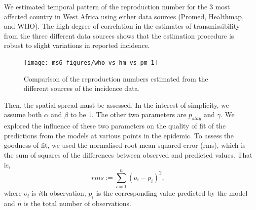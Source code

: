 \documentclass[11pt,]{article}
\begin{document}
We estimated temporal pattern of the reproduction number for the 3 most affected country in West Africa
using either data sources (Promed, Healthmap, and WHO).
The high degree of correlation in the estimates of transmissibility from the three
different data sources shows that the estimation procedure is robust
to slight variations in reported incidence.

\begin{figure}
  \centering
  \texttt{[image: ms6-figures/who\_vs\_hm\_vs\_pm-1]}
  \caption{Comparison of the reproduction numbers estimated from
        the different sources of the incidence data.}
  \label{fig:r_comp}
\end{figure}

\FloatBarrier
Then, the spatial spread must be assessed.
In the interest of simplicity, we assume both
$\alpha$ and $\beta$ to be $1$. The other two parameters are
$p_{stay}$ and $\gamma$. We explored the influence of these two
parameters on the quality of fit of the predictions from the models at various points in the
epidemic. To assess the goodness-of-fit, we used the normalised root mean squared
error (rms), which is the sum of squares of the differences between
observed and predicted values. That is, 
\[ rms := \sum_{i = 1}^n{\left(o_i - p_i\right)^2},\]
where $o_i$ is $i$th observation, $p_i$ is the corresponding value
predicted by the model and $n$ is the total number of observations.
\end{document}
